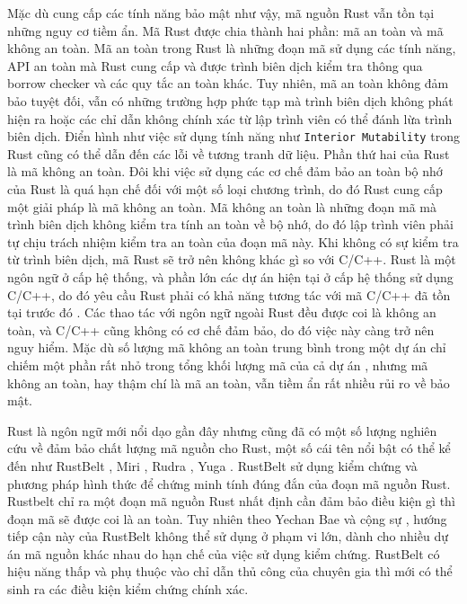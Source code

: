 Mặc dù cung cấp các tính năng bảo mật như vậy, mã nguồn Rust vẫn tồn tại những nguy cơ tiềm ẩn.
Mã Rust được chia thành hai phần: mã an toàn và mã không an toàn.
Mã an toàn trong Rust là những đoạn mã sử dụng các tính năng, API an toàn mà Rust cung cấp và được trình biên dịch kiểm tra thông qua borrow checker và các quy tắc an toàn khác.
Tuy nhiên, mã an toàn không đảm bảo tuyệt đối, vẫn có những trường hợp phức tạp mà trình biên dịch không phát hiện ra hoặc các chỉ dẫn không chính xác từ lập trình viên có thể đánh lừa trình biên dịch. Điển hình như việc sử dụng tính năng như \texttt{Interior Mutability} \cite{poli2024reasoning} trong Rust cũng có thể dẫn đến các lỗi về tương tranh dữ liệu.
Phần thứ hai của Rust là mã không an toàn.
Đôi khi việc sử dụng các cơ chế đảm bảo an toàn bộ nhớ của Rust là quá hạn chế đối với một số loại chương trình, do đó Rust cung cấp một giải pháp là mã không an toàn.
Mã không an toàn là những đoạn mã mà trình biên dịch không kiểm tra tính an toàn về bộ nhớ, do đó lập trình viên phải tự chịu trách nhiệm kiểm tra an toàn của đoạn mã này.
Khi không có sự kiểm tra từ trình biên dịch, mã Rust sẽ trở nên không khác gì so với C/C++.
Rust là một ngôn ngữ ở cấp hệ thống, và phần lớn các dự án hiện tại ở cấp hệ thống sử dụng C/C++, do đó yêu cầu Rust phải có khả năng tương tác với mã C/C++ đã tồn tại trước đó \cite{sharma2023rust}.
Các thao tác với ngôn ngữ ngoài Rust đều được coi là không an toàn, và C/C++ cũng không có cơ chế đảm bảo, do đó việc này càng trở nên nguy hiểm.
Mặc dù số lượng mã không an toàn trung bình trong một dự án chỉ chiếm một phần rất nhỏ trong tổng khối lượng mã của cả dự án \cite{zheng2023closer}, nhưng mã không an toàn, hay thậm chí là mã an toàn, vẫn tiềm ẩn rất nhiều rủi ro về bảo mật.


Rust là ngôn ngữ mới nổi dạo gần đây nhưng cũng đã có một số lượng nghiên cứu về đảm bảo chất lượng mã nguồn cho Rust, một số cái tên nổi bật có thể kể đến như RustBelt \cite{jung2017rustbelt}, Miri \cite{githubGitHubRustlangmiri}, Rudra \cite{bae2021rudra}, Yuga \cite{nitin2024uga}.
RustBelt sử dụng kiểm chứng và phương pháp hình thức để chứng minh tính đúng đắn của đoạn mã nguồn Rust.
Rustbelt chỉ ra một đoạn mã nguồn Rust nhất định cần đảm bảo điều kiện gì thì đoạn mã sẽ được coi là an toàn.
Tuy nhiên theo Yechan Bae và cộng sự \cite{jung2017rustbelt}, hướng tiếp cận này của RustBelt không thể sử dụng ở phạm vi lớn, dành cho nhiều dự án mã nguồn khác nhau do hạn chế của việc sử dụng kiểm chứng.
RustBelt có hiệu năng thấp và phụ thuộc vào chỉ dẫn thủ công của chuyên gia thì mới có thể sinh ra các điều kiện kiểm chứng chính xác.


